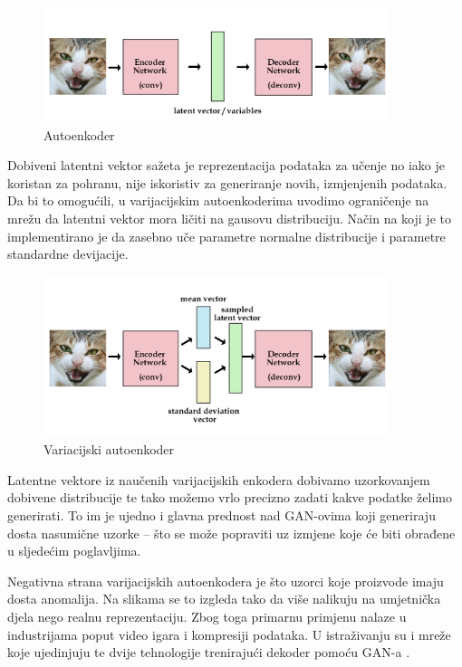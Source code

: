 \documentclass[lmodern, utf8, seminar]{fer}
\begin{document}
\begin{figure}[H]
    \centering
    \includegraphics[width=0.9\textwidth]{autoenc}
    \caption{Autoenkoder \cite{website:kvfrans}}
    \label{fig:autoenc}
\end{figure}

Dobiveni latentni vektor sažeta je reprezentacija podataka za učenje no iako je koristan za pohranu, nije iskoristiv za generiranje novih, izmjenjenih podataka. Da bi to omogućili, u varijacijskim autoenkoderima uvodimo ograničenje na mrežu da latentni vektor mora ličiti na gausovu distribuciju.
Način na koji je to implementirano je da zasebno uče parametre normalne distribucije i parametre standardne devijacije.

\begin{figure}[H]
    \centering
    \includegraphics[width=0.9\textwidth]{vae}
    \caption{Variacijski autoenkoder \cite{website:kvfrans}}
    \label{fig:vae}
\end{figure}

Latentne vektore iz naučenih varijacijskih enkodera dobivamo uzorkovanjem dobivene distribucije te tako možemo vrlo precizno zadati kakve podatke želimo generirati. To im je ujedno i glavna prednost nad GAN-ovima koji generiraju dosta nasumične uzorke -- što se može popraviti uz izmjene koje će biti obrađene u sljedećim poglavljima.

Negativna strana varijacijskih autoenkodera je što uzorci koje proizvode imaju dosta anomalija. Na slikama se to izgleda tako da više nalikuju na umjetnička djela nego realnu reprezentaciju. Zbog toga primarnu primjenu nalaze u industrijama poput video igara i kompresiji podataka. U istraživanju su i mreže koje ujedinjuju te dvije tehnologije trenirajući dekoder pomoću GAN-a \cite{larsen2015autoencoding}.
\end{document}

